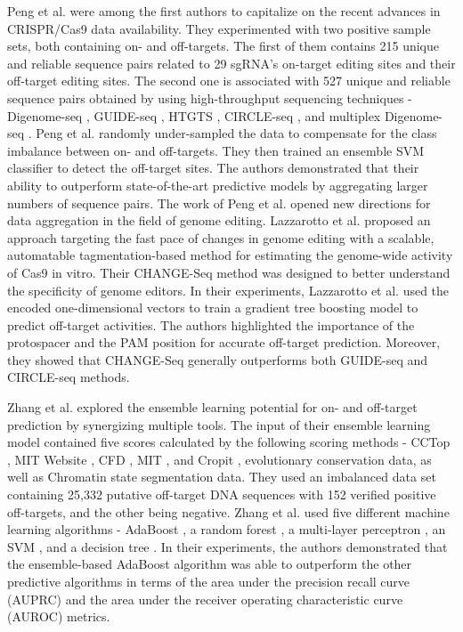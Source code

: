\documentclass[unnumsec,webpdf,contemporary,large]{oup-authoring-template}
\theoremstyle{thmstyleone}%
\theoremstyle{thmstyletwo}%
\theoremstyle{thmstylethree}%
\begin{document}
Peng et al. \cite{peng2018recognition} were among the first authors to capitalize on the recent advances in CRISPR/Cas9 data availability. They experimented with two positive sample sets, both containing on- and off-targets. The first of them contains 215 unique and reliable sequence pairs related to 29 sgRNA's on-target editing sites and their off-target editing sites. The second one is associated with 527 unique and reliable sequence pairs obtained by using high-throughput sequencing techniques - Digenome-seq \cite{kim2015digenome}, GUIDE-seq \cite{tsai2015guide},  HTGTS \cite{frock2015genome}, CIRCLE-seq \cite{tsai2017circle}, and multiplex Digenome-seq \cite{kim2016genome}. Peng et al. randomly under-sampled the data to compensate for the class imbalance between on- and off-targets. They then trained an ensemble SVM classifier to detect the off-target sites. The authors demonstrated that their ability to outperform state-of-the-art predictive models by aggregating larger numbers of sequence pairs. The work of Peng et al. opened new directions for data aggregation in the field of genome editing. Lazzarotto et al. \cite{lazzarotto2020change} proposed an approach targeting the fast pace of changes in genome editing with a scalable, automatable tagmentation-based method for estimating the genome-wide activity of Cas9 in vitro. Their CHANGE-Seq method was designed to better understand the specificity of genome editors. In their experiments, Lazzarotto et al. used the encoded one-dimensional vectors to train a gradient tree boosting model to predict off-target activities. The authors highlighted the importance of the protospacer and the PAM position for accurate off-target prediction. Moreover, they showed that CHANGE-Seq generally outperforms both GUIDE-seq \cite{tsai2015guide} and CIRCLE-seq \cite{tsai2017circle} methods.

Zhang et al. \cite{zhang2019synergizing} explored the ensemble learning potential for on- and off-target prediction by synergizing multiple tools. The input of their ensemble learning model contained five scores calculated by the following scoring methods - CCTop \cite{stemmer2015cctop}, MIT Website \cite{hsu2013dna}, CFD \cite{doench2014rational}, MIT \cite{haeussler2016evaluation}, and Cropit \cite{singh2015cas9}, evolutionary conservation data, as well as Chromatin state segmentation data. They used an imbalanced data set containing 25,332 putative off-target DNA sequences with 152 verified positive off-targets, and the other being negative. Zhang et al. used five different machine learning algorithms - AdaBoost \cite{freund1996experiments}, a random forest \cite{breiman2001random}, a multi-layer perceptron \cite{bishop1995neural}, an SVM \cite{burges1998tutorial}, and a decision tree \cite{quinlan1987simplifying}. In their experiments, the authors demonstrated that the ensemble-based AdaBoost algorithm was able to outperform the other predictive algorithms in terms of the area under the precision recall curve (AUPRC) and the area under the receiver operating characteristic curve (AUROC) metrics.
\end{document}
